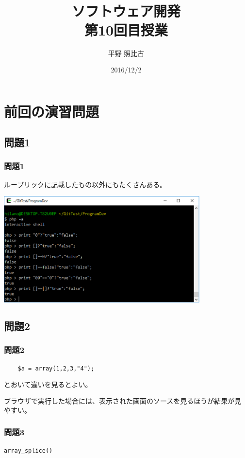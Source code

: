 
\title{ソフトウェア開発\\第10回目授業}
\author{平野 照比古}
\institute{}
\date{2016/12/2}
\newtheorem{Prob}{解説}
\newcommand{\Elm}[1]{\texttt{<#1>}}

\newcommand{\DOMM}{\texttt}
\newcommand{\Event}{\texttt}
\newcommand{\DOMP}{\texttt}
\newcommand{\DOM}{\texttt{DOM}}
\newcommand{\keyitem}{\relax}
\newcommand{\HTML}{HTML文書}

\frame{\maketitle}
\section{前回の演習問題}
\subsection{問題1}
\begin{frame}[containsverbatim]
 \frametitle{問題1}
 ルーブリックに記載したもの以外にもたくさんある。
\begin{center}
 \includegraphics[width=0.8\textwidth]{09-01fig-result1.eps}
\end{center}
\end{frame}
\subsection{問題2}
\begin{frame}[containsverbatim]
 \frametitle{問題2}
 \begin{Verbatim}
	$a = array(1,2,3,"4");
 \end{Verbatim}
 とおいて違いを見るとよい。

 ブラウザで実行した場合には、表示された画面のソースを見るほうが結果が見
 やすい。
\end{frame}
\begin{frame}[containsverbatim]
 \frametitle{問題3}
 \Verb+array_splice()+
\end{frame}

